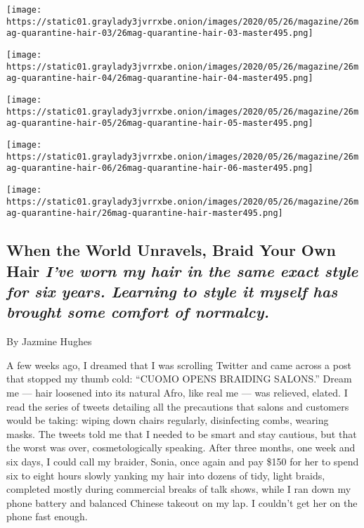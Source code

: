 \texttt{[image: https://static01.graylady3jvrrxbe.onion/images/2020/05/26/magazine/26mag-quarantine-hair-03/26mag-quarantine-hair-03-master495.png]}

\texttt{[image: https://static01.graylady3jvrrxbe.onion/images/2020/05/26/magazine/26mag-quarantine-hair-04/26mag-quarantine-hair-04-master495.png]}

\texttt{[image: https://static01.graylady3jvrrxbe.onion/images/2020/05/26/magazine/26mag-quarantine-hair-05/26mag-quarantine-hair-05-master495.png]}

\texttt{[image: https://static01.graylady3jvrrxbe.onion/images/2020/05/26/magazine/26mag-quarantine-hair-06/26mag-quarantine-hair-06-master495.png]}

\texttt{[image: https://static01.graylady3jvrrxbe.onion/images/2020/05/26/magazine/26mag-quarantine-hair/26mag-quarantine-hair-master495.png]}

\hypertarget{when-the-world-unravels-braid-your-own-hair-ive-worn-my-hair-in-the-same-exact-style-for-six-years-learning-to-style-it-myself-has-brought-some-comfort-of-normalcy}{%
\subsection{\texorpdfstring{When the World Unravels, Braid Your Own Hair
\emph{I've worn my hair in the same exact style for six years. Learning
to style it myself has brought some comfort of
normalcy.}}{When the World Unravels, Braid Your Own Hair I've worn my hair in the same exact style for six years. Learning to style it myself has brought some comfort of normalcy.}}\label{when-the-world-unravels-braid-your-own-hair-ive-worn-my-hair-in-the-same-exact-style-for-six-years-learning-to-style-it-myself-has-brought-some-comfort-of-normalcy}}

By Jazmine Hughes

A few weeks ago, I dreamed that I was scrolling Twitter and came across
a post that stopped my thumb cold: ``CUOMO OPENS BRAIDING SALONS.''
Dream me --- hair loosened into its natural Afro, like real me --- was
relieved, elated. I read the series of tweets detailing all the
precautions that salons and customers would be taking: wiping down
chairs regularly, disinfecting combs, wearing masks. The tweets told me
that I needed to be smart and stay cautious, but that the worst was
over, cosmetologically speaking. After three months, one week and six
days, I could call my braider, Sonia, once again and pay \$150 for her
to spend six to eight hours slowly yanking my hair into dozens of tidy,
light braids, completed mostly during commercial breaks of talk shows,
while I ran down my phone battery and balanced Chinese takeout on my
lap. I couldn't get her on the phone fast enough.

